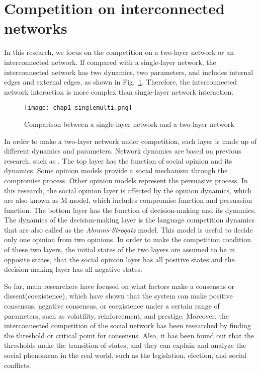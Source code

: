 \section{Competition on interconnected networks}
In this research, we focus on the competition on a two-layer network or an interconnected network. If compared with a single-layer network, the interconnected network has two dynamics, two parameters, and includes internal edges and external edges, as shown in Fig.~\ref{chap1_singlemulti}. Therefore, the interconnected network interaction is more complex than single-layer network interaction.

\begin{figure}[!htb]
	\centering
	\texttt{[image: chap1\_singlemulti.png]}
	\caption{Comparison between a single-layer network and a two-layer network}
	\label{chap1_singlemulti}
\end{figure}

In order to make a two-layer network under competition, each layer is made up of different dynamics and parameters. Network dynamics are based on previous research, such as \parencite{alvarez2016}. The top layer has the function of social opinion and its dynamics. Some opinion models provide a social mechanism through the compromise process.\parencite{naim2003} Other opinion models represent the persuasive process.\parencite{chau2014} In this research, the social opinion layer is affected by the opinion dynamics, which are also known as M-model\parencite{rocca2014}, which includes compromise function and persuasion function. The bottom layer has the function of decision-making and its dynamics. The dynamics of the decision-making layer is the language competition dynamics that are also called as the \textit{Abrams-Strogatz} model\parencite{abrams2003, vazquez2010, patriarca2012}. This model is useful to decide only one opinion from two opinions. In order to make the competition condition of these two layers, the initial states of the two layers are assumed to be in opposite states, that the social opinion layer has all positive states and the decision-making layer has all negative states.

So far, main researchers have focused on what factors make a consensus or dissent(coexistence), which have shown that the system can make positive consensus, negative consensus, or coexistence under a certain range of parameters, such as volatility, reinforcement, and prestige.\parencite{alvarez2016} Moreover, the interconnected competition of the social network has been researched by finding the threshold or critical point for consensus.\parencite{alvarez2016, gomez2015, diep2017} Also, it has been found out that the thresholds make the transition of states, and they can explain and analyze the social phenomena in the real world, such as the legislation, election, and social conflicts.\parencite{alvarez2016, amato2017, diep2017}

